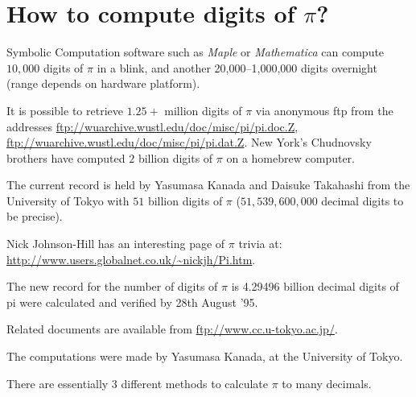 \section{How to compute digits of $\pi$?}

Symbolic Computation software such as {\it Maple} or {\it Mathematica}
can compute $10,000$ digits of $\pi$ in a blink, and another
20,000--1,000,000 digits overnight (range depends on hardware
platform).

It is possible to retrieve $1.25+$ million digits of $\pi$ via anonymous
ftp from the addresses
\url{ftp://wuarchive.wustl.edu/doc/misc/pi/pi.doc.Z},
\url{ftp://wuarchive.wustl.edu/doc/misc/pi/pi.dat.Z}.  New York's
Chudnovsky brothers have computed $2$ billion digits of $\pi$ on a
homebrew computer.

The current record is held by Yasumasa Kanada and Daisuke Takahashi from
the University of Tokyo with $51$ billion digits of $\pi$
($51,539,600,000$ decimal digits to be precise).

Nick Johnson-Hill has an interesting page of $\pi$ trivia at:
\url{http://www.users.globalnet.co.uk/~nickjh/Pi.htm}.

%
%
%
%


%
The new record for the number of digits of $\pi$ is 4.29496 billion
decimal digits of pi were calculated and verified by 28th August '95.

Related documents are available from \url{ftp://www.cc.u-tokyo.ac.jp/}.

The computations were made by Yasumasa Kanada, at the University of
Tokyo.



There are essentially 3 different methods to calculate $\pi$ to many
decimals.

